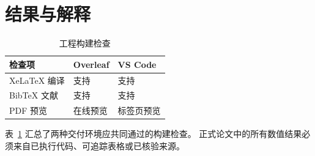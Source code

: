 \section{结果与解释}

\begin{table}[htbp]
  \centering
  \caption{工程构建检查}
  \label{tab:build-check}
  \begin{tabular}{lll}
    \toprule
    检查项 & Overleaf & VS Code \\
    \midrule
    XeLaTeX 编译 & 支持 & 支持 \\
    BibTeX 文献 & 支持 & 支持 \\
    PDF 预览 & 在线预览 & 标签页预览 \\
    \bottomrule
  \end{tabular}
\end{table}

表~\ref{tab:build-check} 汇总了两种交付环境应共同通过的构建检查。
正式论文中的所有数值结果必须来自已执行代码、可追踪表格或已核验来源。
